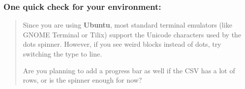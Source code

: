 \documentclass[
]{article}
\begin{document}
\hypertarget{one-quick-check-for-your-environment}{%
\subsubsection{\texorpdfstring{\textbf{One quick check for your
environment:}}{One quick check for your environment:}}\label{one-quick-check-for-your-environment}}

\begin{quote}
Since you are using \textbf{Ubuntu}, most standard terminal emulators
(like GNOME Terminal or Tilix) support the Unicode characters used by
the dots spinner. However, if you see weird blocks instead of dots, try
switching the type to line.

Are you planning to add a progress bar as well if the CSV has a lot of
rows, or is the spinner enough for now?
\end{quote}
\end{document}
